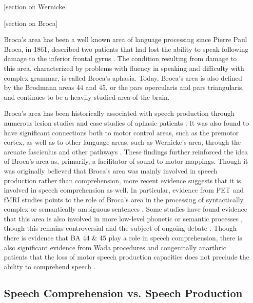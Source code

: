 \documentclass[titlepage]{article}
\begin{document}
    [section on Wernicke]


    [section on Broca]

    Broca's area has been a well known area of language processing since
    Pierre Paul Broca, in 1861, described two patients that had lost the
    ability to speak following damage to the inferior frontal gyrus
    \cite{Dronkers2007}. The condition resulting from damage to this area,
    characterized by problems with fluency in speaking and difficulty with
    complex grammar, is called Broca's aphasia. Today, Broca's area is also
    defined by the Brodmann areas 44 and 45, or the pars opercularis and pars
    triangularis, and continues to be a heavily studied area of the brain.

    Broca's area has been historically associated with speech
    production through numerous lesion studies and case studies of aphasic
    patients \cite{Dronkers2007}. It was also found to have significant
    connections both to motor control areas, such as the premotor cortex,
    as well as to other language areas, such as Wernicke's area, through the
    arcuate fasciculus and other pathways \cite{Friederici2011}. These findings
    further reinforced the idea of Broca's area as, primarily, a facilitator of
    sound-to-motor mappings. Though it was originally believed that Broca's
    area was mainly involved in
    speech production rather than comprehension, more recent evidence suggests
    that it is involved in speech comprehension as well. In
    particular, evidence from PET and fMRI studies points to the role of Broca's
    area in the processing of syntactically complex or semantically ambiguous
    sentences \cite{Rodd2005,Ojanen2005,Zurif1980}. Some studies have found
    evidence that this area is also involved in more low-level phonetic or
    semantic processes \cite{Zatorre1992}, though this remains controversial
    and the subject of ongoing debate \cite{Hickok2013,Friederici2011}. Though
    there is evidence that BA 44 \& 45 play a role in speech comprehension, there
    is also significant evidence from Wada procedures and congenitally anarthric
    patients that the loss of motor speech production capacities does not
    preclude the ability to comprehend speech \cite{Hickok2013}.


  \subsection{Speech Comprehension vs. Speech Production}
\end{document}
